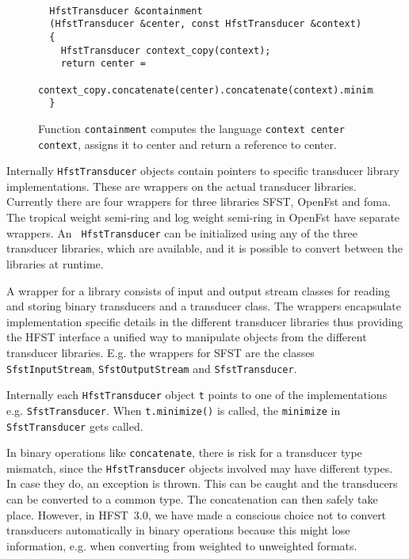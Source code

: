 \documentclass{llncs}
\begin{document}
\begin{figure}
\begin{center}
\caption{Function {\tt containment} computes the language {\tt context center context}, assigns it to center and return a reference to center.}\label{containment-figure}
\begin{verbatim}

  HfstTransducer &containment
  (HfstTransducer &center, const HfstTransducer &context)
  {
    HfstTransducer context_copy(context);
    return center = 
      context_copy.concatenate(center).concatenate(context).minimize();
  }
\end{verbatim}
\end{center}
\end{figure}

Internally {\tt HfstTransducer} objects contain pointers to specific
transducer library implementations. These are wrappers on the actual
transducer libraries. Currently there are four wrappers for three
libraries SFST, OpenFst and foma. The tropical weight semi-ring and log
weight semi-ring in OpenFst have separate wrappers. An {\tt
  HfstTransducer} can be initialized using any of the three transducer
libraries, which are available, and it is possible to convert between
the libraries at runtime.

A wrapper for a library consists of input and output stream classes
for reading and storing binary transducers and a transducer class. The
wrappers encapsulate implementation specific details in the different
transducer libraries thus providing the HFST interface a unified way
to manipulate objects from the different transducer
libraries. E.g. the wrappers for SFST are the classes {\tt
  SfstInputStream}, {\tt SfstOutputStream} and {\tt SfstTransducer}.

Internally each {\tt HfstTransducer} object {\tt t} points to one of
the implementations e.g. {\tt SfstTransducer}. When {\tt t.minimize()}
is called, the {\tt minimize} in {\tt SfstTransducer} gets called. 

In binary operations like {\tt concatenate}, there is risk for a
transducer type mismatch, since the {\tt HfstTransducer} objects
involved may have different types. In case they do, an exception is
thrown. This can be caught and the transducers can be converted to a
common type. The concatenation can then safely take place. 
However, in HFST~3.0, we have made a conscious choice not to convert transducers
automatically in binary operations because this might lose
information, e.g. when converting from weighted to unweighted formats.
\end{document}
